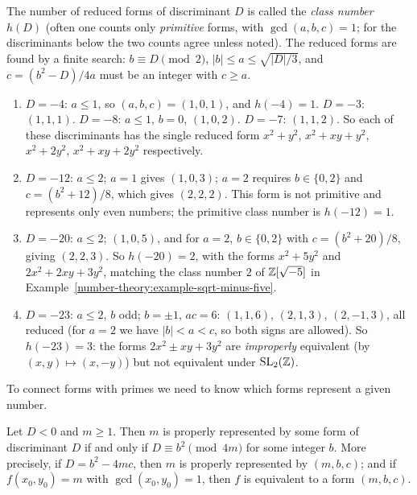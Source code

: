 The number of reduced forms of discriminant $D$ is called the \emph{class number} $h(D)$ (often one counts only \emph{primitive} forms, with $\gcd(a, b, c) = 1$; for the discriminants below the two counts
agree unless noted). The reduced forms are found by a finite search: $b \equiv D \pmod 2$, $|b| \leq a \leq \sqrt{|D|/3}$, and $c = (b^2 - D)/4a$ must be an integer with $c \geq a$.

\begin{example}\label{number-theory:example-reduced-forms}
\begin{enumerate}
\item $D = -4$: $a \leq 1$, so $(a, b, c) = (1, 0, 1)$, and $h(-4) = 1$. $D = -3$: $(1, 1, 1)$. $D = -8$: $a \leq 1$, $b = 0$, $(1, 0, 2)$. $D = -7$: $(1, 1, 2)$. So each of these discriminants has the single
reduced form $x^2 + y^2$, $x^2 + xy + y^2$, $x^2 + 2y^2$, $x^2 + xy + 2y^2$ respectively.
\item $D = -12$: $a \leq 2$; $a = 1$ gives $(1, 0, 3)$; $a = 2$ requires $b \in \{0, 2\}$ and $c = (b^2 + 12)/8$, which gives $(2, 2, 2)$. This form is not primitive and represents only even numbers;
the primitive class number is $h(-12) = 1$.
\item $D = -20$: $a \leq 2$; $(1, 0, 5)$, and for $a = 2$, $b \in \{0, 2\}$ with $c = (b^2 + 20)/8$, giving $(2, 2, 3)$. So $h(-20) = 2$, with the forms $x^2 + 5y^2$ and $2x^2 + 2xy + 3y^2$, matching the class
number $2$ of $\mathbb{Z}[\sqrt{-5}]$ in Example~\ref{number-theory:example-sqrt-minus-five}.
\item $D = -23$: $a \leq 2$, $b$ odd; $b = \pm1$, $ac = 6$: $(1, 1, 6)$, $(2, 1, 3)$, $(2, -1, 3)$, all reduced (for $a = 2$ we have $|b| < a < c$, so both signs are allowed). So $h(-23) = 3$: the forms
$2x^2 \pm xy + 3y^2$ are \emph{improperly} equivalent (by $(x, y) \mapsto (x, -y)$) but not equivalent under $\mathrm{SL}_2(\mathbb{Z})$.
\end{enumerate}
\end{example}

To connect forms with primes we need to know which forms represent a given number.

\begin{lemma}\label{number-theory:lemma-representation}
Let $D < 0$ and $m \geq 1$. Then $m$ is properly represented by some form of discriminant $D$ if and only if $D \equiv b^2 \pmod{4m}$ for some integer $b$. More precisely, if $D = b^2 - 4mc$, then $m$ is
properly represented by $(m, b, c)$; and if $f(x_0, y_0) = m$ with $\gcd(x_0, y_0) = 1$, then $f$ is equivalent to a form $(m, b, c)$.
\end{lemma}

